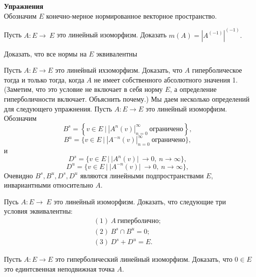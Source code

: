 \textbf{Упражнения} \\

Обозначим $E$  конечно-мерное нормированное векторное пространство. \\

\begin{exercise}
\label{exercise2_1} 
Пусть $A : E \rightarrow \ E$ это линейный изоморфизм. Доказать $m(A) = |A^(-1)|^(-1).$
\end{exercise} 

\begin{exercise}
\label{exercise2_2} 
Доказать, что все нормы на $E$ эквивалентны
\end{exercise} 

\begin{exercise}
\label{exercise2_3} 
Пусть $A : E \rightarrow E$ это линейный ихзоморфизм. Доказать, что $A$ гиперболическое тогда и только тогда, когда $A$ не имеет собственного абсолютного значения 1. (Заметим, что это условие не включает в себя норму $E$, а определение гиперболичности включает. Объяснить почему.)
Мы даем несколько определений для следующего упражнения. Пусть $A : E \rightarrow E$  это линейный изоморфизм. Обозначим
$$
B^s = \left\{v \in E \ | \ {|A^n(v)|}^\infty_{n=0} \ \textit{ограничено}\right\}, 
$$
$$
B^u = \{v \in E \ | \ {|A^{-n}(v)|}^\infty_{n=0} \ \textit{ограничено}\},
$$
и
$$
D^s = \{v \in E \ | \ | A^n (v)| \ \rightarrow 0, \ n \rightarrow \infty \},
$$
$$
D^u = \{v \in E \ | \ | A^{-n} (v)| \ \rightarrow 0, \ n \rightarrow \infty \},
$$
Очевидно $B^s, B^u, D^s, D^u$ являются линейными подпространствами $E$, инвариантными относительно $A$.
\end{exercise} 

\begin{exercise}
\label{exercise2_4} 
Пусь $A : E \rightarrow \ E$ это линейный изоморфизм. Доказать, что следующие три условия эквивалентны:
$$
\begin{array}{ll}
(1) \ A \ \textit{гиперболично}; \\
(2) \ B^s \cap B^u = {0}; \\
(3) \ D^s + D^u = E.
\end{array}
$$
\end{exercise} 

\begin{exercise}
\label{exercise2_5} 
Пусть $A : E \rightarrow E$ это гиперболический линейный изоморфизм. Доказать, что $0 \in E$ это единтсвенная неподвижная точка $A$.
\end{exercise} 

